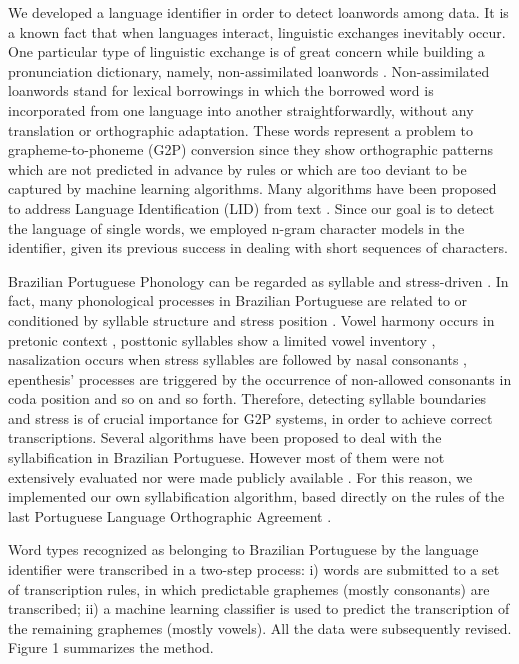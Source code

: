 We developed a language identifier in order to detect loanwords among data. 
It is a known fact that when languages interact, linguistic exchanges inevitably occur. 
One particular type of linguistic exchange is of great concern while building a pronunciation
dictionary, namely, non-assimilated loanwords \cite{Bussmann96}. Non-assimilated loanwords stand
for lexical borrowings in which the borrowed word is incorporated from one language into another
straightforwardly, without any translation or orthographic adaptation. These words represent a problem to 
grapheme-to-phoneme (G2P) conversion since they show orthographic patterns which are not predicted in advance by rules or
which are too deviant to be captured by machine learning algorithms. Many algorithms
have been proposed to address Language Identification (LID) from text \cite{Bergsma2012}\cite{Bilcu2006}\cite{Dolf2012}\cite{Zampieri2012}. Since our goal is to detect the language of single words, we employed n-gram character 
models in the identifier, given its previous success in dealing with short sequences of characters. 

Brazilian Portuguese Phonology can be regarded as syllable and stress-driven \cite{Cristofaro2005}. In fact,
many phonological processes in Brazilian Portuguese are related to or conditioned by 
syllable structure and stress position \cite{Girelli1990}. Vowel harmony occurs in pretonic context 
\cite{Bisol1989}, posttonic syllables show a limited vowel inventory \cite{Cristofaro2005}, nasalization occurs
when stress syllables are followed by nasal consonants \cite{Quicoli1990}, epenthesis' processes are triggered
by the occurrence of non-allowed consonants in coda position \cite{Delatorre2005} and so on and so forth. Therefore, 
detecting syllable boundaries and stress is of crucial importance for G2P systems, in order to achieve 
correct transcriptions. Several algorithms have been proposed to deal with the syllabification in Brazilian
Portuguese. However most of them were not extensively evaluated nor were made publicly available \cite{Oliveira2005}
\cite{Nhenhem2012} \cite{Neto2011} \cite{Rocha2013}. For this reason, we implemented our own syllabification algorithm, 
based directly on the rules of the last Portuguese Language Orthographic Agreement \cite{Acordo2009}. 

Word types recognized as belonging to Brazilian Portuguese by the language identifier were transcribed in a two-step process:
i) words are submitted to a set of transcription rules, in which predictable graphemes (mostly consonants)
are transcribed; ii) a machine learning classifier is used to predict the transcription of the remaining graphemes (mostly vowels). 
All the data were subsequently revised. Figure 1 summarizes the method.

